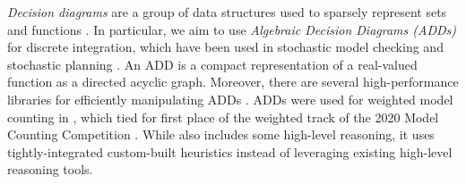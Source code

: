 \emph{Decision diagrams} are a group of data structures used to sparsely represent sets and functions \cite{akers1978binary,bahar1997algebraic,minato1993zero,sanner2005affine}. 
In particular, we aim to use \emph{Algebraic Decision Diagrams (ADDs)} \cite{bahar1997algebraic} for discrete integration, which have been used in stochastic model checking \cite{KNP07} and stochastic planning \cite{HSHB99}. 
An ADD is a compact representation of a real-valued function as a directed acyclic graph. 
Moreover, there are several high-performance libraries for efficiently manipulating ADDs \cite{somenzi2015cudd,van2015sylvan}.
ADDs were used for weighted model counting in \addmc{} \cite{DPV20,phan2019weighted}, which tied for first place of the weighted track of the 2020 Model Counting Competition \cite{fichte2020model}.
While \addmc{} also includes some high-level reasoning, it uses tightly-integrated custom-built heuristics \cite{dechter99,bouquet99,tarjan1984simple,koster2001treewidth} instead of leveraging existing high-level reasoning tools.






